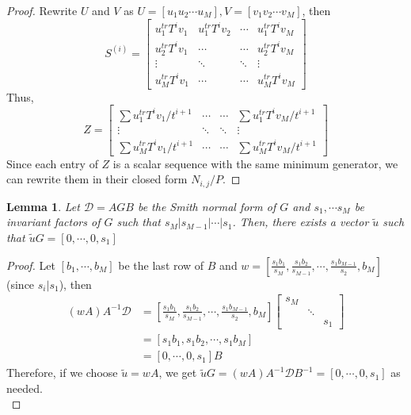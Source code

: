 \documentclass[12pt]{article}
\newtheorem{lemma}[definition]{Lemma}
\begin{document}
\begin{proof}
	Rewrite $U$ and $V$ as $U = [u_1 u_2 \cdots u_M],
	V = [v_1 v_2 \cdots v_M]$, then
	$$S^{(i)} = 
	\begin{bmatrix}
	u_1^{tr}T^iv_1 & u_1^{tr}T^iv_2 & \cdots & u_1^{tr}T^iv_M \\
	u_2^{tr}T^iv_1 & \cdots         & \cdots   & u_2^{tr}T^iv_M \\
	\vdots           & \ddots           & \ddots   & \vdots \\
	u_M^{tr}T^iv_1 & \cdots           & \cdots   & u_M^{tr}T^iv_M
	\end{bmatrix}$$
	Thus,
	$$ Z = 
	\begin{bmatrix}
	\sum u_1^{tr}T^iv_1/t^{i+1} & \cdots  & \cdots & \sum u_1^{tr}T^iv_M/t^{i+1} \\
	\vdots                        & \ddots  & \ddots & \vdots \\
	\sum u_M^{tr}T^iv_1/t^{i+1} & \cdots  & \cdots & \sum u_M^{tr}T^iv_M/t^{i+1}
	\end{bmatrix}$$
	Since each entry of $Z$ is a scalar sequence with the same
	minimum generator, we can rewrite them in their closed form
	$N_{i,j}/P$.
\end{proof}

\begin{lemma}\label{utilde}
	Let $\mathscr{D} = AGB$ be the Smith normal form of $G$ and $s_1, \cdots s_M$ be
	invariant factors of $G$ such that 
	$s_M | s_{M-1} | \cdots | s_1$. Then, there exists a vector $\tilde{u}$
	such that $\tilde{u} G = [0, \cdots, 0, s_1]$\\
\end{lemma}

\begin{proof}
	Let $[b_1,\cdots,b_M]$ be the last row of $B$ and 
	$w = [\frac{s_1b_1}{s_M},\frac{s_1b_2}{s_{M-1}},\cdots,\frac{s_1b_{M-1}}{s_2},b_M]$ (since $s_i | s_1$), then
	\begin{align*}
	(w A) A^{-1} \mathscr{D} &=  [\frac{s_1b_1}{s_M},\frac{s_1b_2}{s_{M-1}},\cdots,\frac{s_1b_{M-1}}{s_2},b_M]
	\begin{bmatrix}
	s_M &        & \\
	& \ddots & \\
	&        & s_1
	\end{bmatrix}\\
	&= [s_1b_1, s_1b_2, \cdots, s_1b_M]\\
	&= [0,\cdots,0,s_1] B
	\end{align*}
	Therefore, if we choose $\tilde{u} = w A$, we get
	$ \tilde{u} G = (w A) A^{-1} \mathscr{D} B^{-1} = 
	[0,\cdots,0,s_1]$ as needed.\\
\end{proof}
\end{document}
